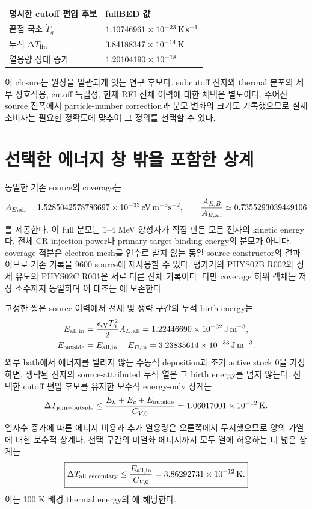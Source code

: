 \documentclass[11pt,a4paper]{article}
\newcommand{\units}[1]{\,\mathrm{#1}}
\begin{document}
\begin{center}
\begin{tabular}{P{.49\linewidth}P{.39\linewidth}}
\toprule
명시한 cutoff 편입 후보 & fullBED 값\\
\midrule
끝점 국소 \(\dot T_g\) & \(\ThermalJoinRate\units{K\,s^{-1}}\)\\
누적 \(\Delta T_{\rm lin}\) & \(\ThermalJoinDeltaT\units{K}\)\\
열용량 상대 증가 & \(1.20104190\times10^{-18}\)\\
\bottomrule
\end{tabular}
\end{center}

이 closure는 원장을 일관되게 잇는 연구 후보다. subcutoff 전자와 thermal 분포의 세부
상호작용, cutoff 독립성, 현재 REI 전체 이력에 대한 채택은 별도이다.
주어진 source 진폭에서 particle-number correction과 분모 변화의 크기도 기록했으므로
실제 소비자는 필요한 정확도에 맞추어 그 정의를 선택할 수 있다.

\section{선택한 에너지 창 밖을 포함한 상계}

동일한 기존 source의 coverage는
\[
A_{E,\rm all}=1.5285042578786697\times10^{-33}
\units{eV\,m^{-3}s^{-2}},\qquad
\frac{A_{E,B}}{A_{E,\rm all}}\simeq0.7355293039449106
\]
를 제공한다. 이 full 분모는 \(1\)--\(4\) MeV 양성자가 직접 만든 모든 전자의 kinetic energy다.
전체 CR injection power나 primary target binding energy의 분모가 아니다.
coverage 적분은 electron mesh를 인수로 받지 않는 동일 source constructor의 결과이므로
기존 기록을 9600 source에 재사용할 수 있다.\cite{coverage,source}
평가기의 PHYS02B R002와 상세 유도의 PHYS02C R001은 서로 다른 전체 기록이다.
다만 coverage 하위 객체는 저장 소수까지 동일하며 이 대조는
에 보존한다.

고정한 짧은 source 이력에서 전체 및 생략 구간의 누적 birth energy는
\begin{align}
E_{\rm all,in}&=\frac{\epsilon_{\rm eV}T_0^2}{2}A_{E,\rm all}
=\AllEnergy\units{J\,m^{-3}},\\
E_{\rm outside}&=E_{\rm all,in}-E_{B,\rm in}
=\OutsideEnergy\units{J\,m^{-3}}.
\end{align}
외부 bath에서 에너지를 빌리지 않는 수동적 deposition과 초기 active stock 0을 가정하면,
생략된 전자의 source-attributed 누적 열은 그 birth energy를 넘지 않는다.
선택한 cutoff 편입 후보를 유지한 보수적 energy-only 상계는
\begin{equation}
\Delta T_{\rm join+outside}
\le\frac{E_h+E_c+E_{\rm outside}}{C_{V,0}}
=\JoinOutsideUpper\units{K}.
\end{equation}
입자수 증가에 따른 에너지 비용과 추가 열용량은 오른쪽에서 무시했으므로 양의 가열에
대한 보수적 상계다. 선택 구간의 미열화 에너지까지 모두 열에 허용하는 더 넓은 상계는
\begin{equation}
\boxed{\Delta T_{\rm all\ secondary}
\le\frac{E_{\rm all,in}}{C_{V,0}}=\AllSecondaryUpper\units{K}.}
\end{equation}
이는 100 K 배경 thermal energy의 \AllSecondaryRelative{}에 해당한다.
\end{document}
